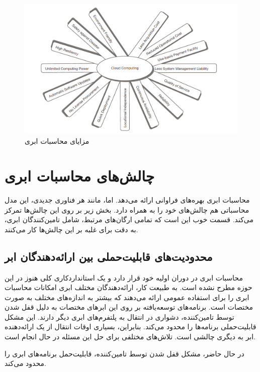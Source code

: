 \documentclass{book}
\begin{document}
    \begin{figure}[htbp]

        \centering
        \includegraphics[width=1\textwidth]{image/fig 3.2.png}
        \caption{مزایای محاسبات ابری}
        \label{fig:fig_3.2}

    \end{figure}

    \section{چالش‌های محاسبات ابری}

        محاسبات ابری بهره‌های فراوانی ارائه می‌دهد. اما، مانند هر فناوری جدیدی، این مدل محاسباتی هم چالش‌های خود را به همراه دارد. بخش زیر بر روی این چالش‌ها تمرکز می‌کند. قسمت خوب این است که تمامی ارگان‌های مرتبط، شامل تامین‌کنندگان ابری، به دقت برای غلبه بر این چالش‌ها کار می‌کنند.
    
    \subsection{محدودیت‌های قابلیت‌حملی بین ارائه‌دهندگان ابر}

        محاسبات ابری در دوران اولیه خود قرار دارد و یک استانداردکاری کلی هنوز در این حوزه مطرح نشده است. به طبیعت کار، ارائه‌دهندگان مختلف ابری امکانات محاسبات ابری را برای استفاده عمومی ارائه می‌دهند که بیشتر به اندازه‌های مختلف به صورت مختصات است. برنامه‌های توسعه‌یافته بر روی این ابرهای مختصات به دلیل قفل شدن توسط تامین‌کننده، دشواری در انتقال به پلتفرم‌های ابری دیگر دارند. این مشکل قابلیت‌حملی برنامه‌ها را محدود می‌کند. بنابراین، بسیاری اوقات انتقال از یک ارائه‌دهنده ابر به دیگری چالشی است. تلاش‌های مختلفی برای حل این مسئله در حال انجام است.

    \begin{addinfo}

        در حال حاضر، مشکل قفل شدن توسط تامین‌کننده، قابلیت‌حمل برنامه‌های ابری را محدود می‌کند.

    \end{addinfo}
\end{document}
